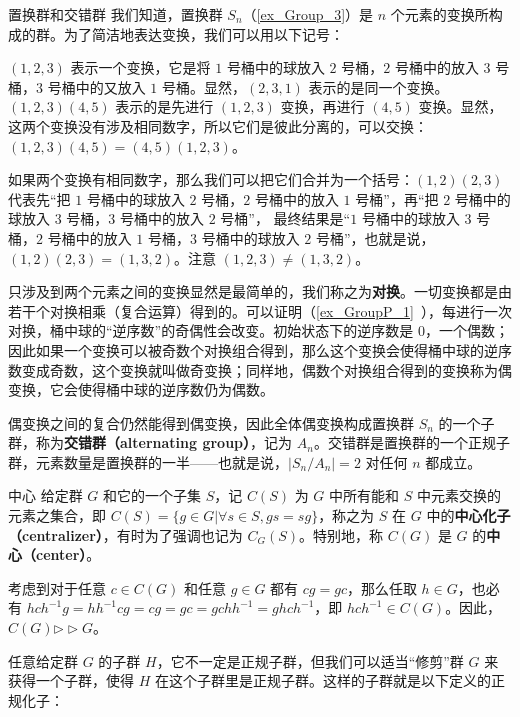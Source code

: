 \begin{example}{置换群和交错群}\label{ex_NormSG_5}
我们知道，置换群 $S_n$（\autoref{ex_Group_3}）是 $n$ 个元素的变换所构成的群。为了简洁地表达变换，我们可以用以下记号：

$(1,2,3)$ 表示一个变换，它是将 $1$ 号桶中的球放入 $2$ 号桶，$2$ 号桶中的放入 $3$ 号桶，$3$ 号桶中的又放入 $1$ 号桶。显然，$(2,3,1)$ 表示的是同一个变换。$(1,2,3)(4,5)$ 表示的是先进行 $(1,2,3)$ 变换，再进行 $(4,5)$ 变换。显然，这两个变换没有涉及相同数字，所以它们是彼此分离的，可以交换：$(1,2,3)(4,5)=(4,5)(1,2,3)$。

如果两个变换有相同数字，那么我们可以把它们合并为一个括号：$(1,2)(2,3)$ 代表先“把 $1$ 号桶中的球放入 $2$ 号桶，$2$ 号桶中的放入 $1$ 号桶”，再“把 $2$ 号桶中的球放入 $3$ 号桶，$3$ 号桶中的放入 $2$ 号桶”， 最终结果是“$1$ 号桶中的球放入 $3$ 号桶，$2$ 号桶中的放入 $1$ 号桶，$3$ 号桶中的球放入 $2$ 号桶”，也就是说，$(1,2)(2,3)=(1,3,2)$。注意 $(1,2,3)\not=(1,3,2)$。

只涉及到两个元素之间的变换显然是最简单的，我们称之为\textbf{对换}。一切变换都是由若干个对换相乘（复合运算）得到的。可以证明（\autoref{ex_GroupP_1}~），每进行一次对换，桶中球的“逆序数”的奇偶性会改变。初始状态下的逆序数是 $0$，一个偶数；因此如果一个变换可以被奇数个对换组合得到，那么这个变换会使得桶中球的逆序数变成奇数，这个变换就叫做奇变换；同样地，偶数个对换组合得到的变换称为偶变换，它会使得桶中球的逆序数仍为偶数。

偶变换之间的复合仍然能得到偶变换，因此全体偶变换构成置换群 $S_n$ 的一个子群，称为\textbf{交错群（alternating group）}，记为 $A_n$。交错群是置换群的一个正规子群，元素数量是置换群的一半——也就是说，$|S_n/A_n|=2$ 对任何 $n$ 都成立。
\end{example}

\begin{example}{中心}\label{ex_NormSG_1}
给定群 $G$ 和它的一个子集 $S$，记 $C(S)$ 为 $G$ 中所有能和 $S$ 中元素交换的元素之集合，即 $C(S)=\{g\in G|\forall s\in S, gs=sg\}$，称之为 $S$ 在 $G$ 中的\textbf{中心化子（centralizer）}，有时为了强调也记为 $C_G(S)$。特别地，称 $C(G)$ 是 $G$ 的\textbf{中心（center）}。

考虑到对于任意 $c\in C(G)$ 和任意 $g\in G$ 都有 $cg=gc$，那么任取 $h\in G$，也必有 $hch^{-1}g=hh^{-1}cg=cg=gc=gchh^{-1}=ghch^{-1}$，即 $hch^{-1}\in C(G)$。因此，$C(G)\rhd\vartriangleright G$。
\end{example}


任意给定群 $G$ 的子群 $H$，它不一定是正规子群，但我们可以适当“修剪”群 $G$ 来获得一个子群，使得 $H$ 在这个子群里是正规子群。这样的子群就是以下定义的正规化子：


